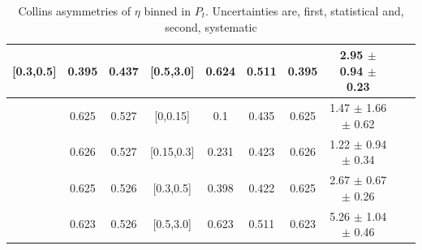 \begin{table}[H]
\begin{tabular}{|c| c| c| c| c| c| c| c| c| c|}
[0.3,0.5]	&	0.395	&	0.437	&	[0.5,3.0]	&	0.624	&	0.511	&	0.395	&2.95  $\pm$ 0.94  $\pm$ 0.23  	\\ \hline
\hline
[0.5,3.0]	&	0.625	&	0.527	&	[0,0.15]	&	0.1	        &	0.435	&0.625	&1.47  $\pm$ 1.66  $\pm$ 0.62  	\\ \hline
[0.5,3.0]	&	0.626	&	0.527	&	[0.15,0.3]	&	0.231	&	0.423	&	0.626	&1.22  $\pm$ 0.94  $\pm$ 0.34  	\\ \hline
[0.5,3.0]	&	0.625	&	0.526	&	[0.3,0.5]	&	0.398	&	0.422	&	0.625	&2.67  $\pm$ 0.67  $\pm$ 0.26  	\\ \hline
[0.5,3.0]	&	0.623	&	0.526	&	[0.5,3.0]	&	0.623	&	0.511	&	0.623	&5.26  $\pm$ 1.04  $\pm$ 0.46  	\\ \hline
\end{tabular}
\caption[Collins asymmetries of $\eta$ binned in $P_t$]{Collins asymmetries of $\eta$ binned in $P_t$. Uncertainties are, first, statistical and, second, systematic}
\label{tab:finaletaptbin}
\end{table}

